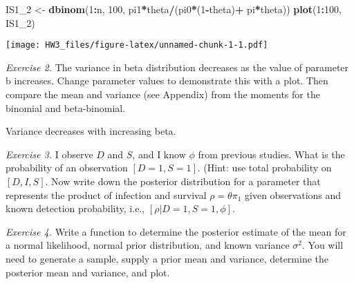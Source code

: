 \documentclass[]{article}
\newenvironment{Shaded}{\begin{snugshade}}{\end{snugshade}}
\newcommand{\DecValTok}[1]{\textcolor[rgb]{0.00,0.00,0.81}{#1}}
\newcommand{\KeywordTok}[1]{\textcolor[rgb]{0.13,0.29,0.53}{\textbf{#1}}}
\newcommand{\NormalTok}[1]{#1}
\newcommand{\OperatorTok}[1]{\textcolor[rgb]{0.81,0.36,0.00}{\textbf{#1}}}
\newcommand{\StringTok}[1]{\textcolor[rgb]{0.31,0.60,0.02}{#1}}
\begin{document}
\begin{Shaded}
\begin{Highlighting}[]
\NormalTok{IS1_}\DecValTok{2}\NormalTok{ <-}\StringTok{ }\KeywordTok{dbinom}\NormalTok{(}\DecValTok{1}\OperatorTok{:}\NormalTok{n, }\DecValTok{100}\NormalTok{, pi1}\OperatorTok{*}\NormalTok{theta}\OperatorTok{/}\NormalTok{(pi0}\OperatorTok{*}\NormalTok{(}\DecValTok{1}\OperatorTok{-}\NormalTok{theta)}\OperatorTok{+}\StringTok{ }\NormalTok{pi}\OperatorTok{*}\NormalTok{theta))}
\KeywordTok{plot}\NormalTok{(}\DecValTok{1}\OperatorTok{:}\DecValTok{100}\NormalTok{, IS1_}\DecValTok{2}\NormalTok{)}
\end{Highlighting}
\end{Shaded}

\texttt{[image: HW3\_files/figure-latex/unnamed-chunk-1-1.pdf]}

\emph{Exercise 2.} The variance in beta distribution decreases as the
value of parameter b increases. Change parameter values to demonstrate
this with a plot. Then compare the mean and variance (see Appendix) from
the moments for the binomial and beta-binomial.

Variance decreases with increasing beta.

\emph{Exercise 3.} I observe \(D\) and \(S\), and I know \(\phi\) from
previous studies. What is the probability of an observation
\([D=1,S=1]\). (Hint: use total probability on \([D,I,S]\). Now write
down the posterior distribution for a parameter that represents the
product of infection and survival \(\rho=\theta\pi_1\) given
observations and known detection probability, i.e.,
\([\rho|D=1,S=1,\phi]\).

\emph{Exercise 4.} Write a function to determine the posterior estimate
of the mean for a normal likelihood, normal prior distribution, and
known variance \(\sigma^2\). You will need to generate a sample, supply
a prior mean and variance, determine the posterior mean and variance,
and plot.
\end{document}
